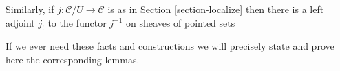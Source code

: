 \medskip\noindent
Similarly, if $j : \mathcal{C}/U \to \mathcal{C}$ is as in
Section \ref{section-localize} then there is a left adjoint $j_!$
to the functor $j^{-1}$ on sheaves of pointed sets 

\medskip\noindent
If we ever need these facts and constructions we will precisely
state and prove here the corresponding lemmas.












